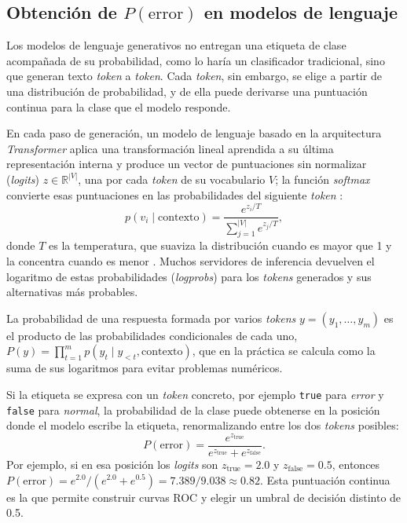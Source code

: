 \subsection{Obtención de $P(\text{error})$ en modelos de lenguaje}\label{sec:mt_probabilidad}

Los modelos de lenguaje generativos no entregan una etiqueta de clase acompañada de su probabilidad, como lo haría un clasificador tradicional, sino que generan texto \textit{token} a \textit{token}. Cada \textit{token}, sin embargo, se elige a partir de una distribución de probabilidad, y de ella puede derivarse una puntuación continua para la clase que el modelo responde.

En cada paso de generación, un modelo de lenguaje basado en la arquitectura \textit{Transformer} aplica una transformación lineal aprendida a su última representación interna y produce un vector de puntuaciones sin normalizar (\textit{logits}) $z \in \mathbb{R}^{|V|}$, una por cada \textit{token} de su vocabulario $V$; la función \textit{softmax} convierte esas puntuaciones en las probabilidades del siguiente \textit{token} \cite{vaswani2017_attention}:
\begin{equation}
p(v_i \mid \text{contexto}) = \frac{e^{z_i / T}}{\sum_{j=1}^{|V|} e^{z_j / T}},
\end{equation}
donde $T$ es la temperatura, que suaviza la distribución cuando es mayor que 1 y la concentra cuando es menor \cite{yang2025_lightweight}. Muchos servidores de inferencia devuelven el logaritmo de estas probabilidades (\textit{logprobs}) para los \textit{tokens} generados y sus alternativas más probables.

La probabilidad de una respuesta formada por varios \textit{tokens} $y = (y_1, \ldots, y_m)$ es el producto de las probabilidades condicionales de cada uno, $P(y) = \prod_{t=1}^{m} p(y_t \mid y_{<t}, \text{contexto})$, que en la práctica se calcula como la suma de sus logaritmos para evitar problemas numéricos.

Si la etiqueta se expresa con un \textit{token} concreto, por ejemplo \texttt{true} para \emph{error} y \texttt{false} para \emph{normal}, la probabilidad de la clase puede obtenerse en la posición donde el modelo escribe la etiqueta, renormalizando entre los dos \textit{tokens} posibles:
\begin{equation}
P(\text{error}) = \frac{e^{z_{\text{true}}}}{e^{z_{\text{true}}} + e^{z_{\text{false}}}}.
\end{equation}
Por ejemplo, si en esa posición los \textit{logits} son $z_{\text{true}} = 2.0$ y $z_{\text{false}} = 0.5$, entonces $P(\text{error}) = e^{2.0}/(e^{2.0} + e^{0.5}) = 7.389/9.038 \approx 0.82$. Esta puntuación continua es la que permite construir curvas ROC y elegir un umbral de decisión distinto de 0.5.

